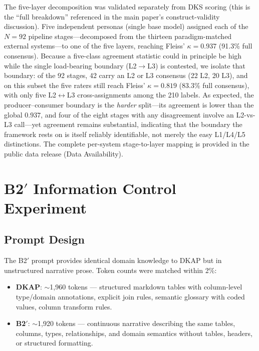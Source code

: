 \documentclass[10pt,a4paper]{article}
\begin{document}
The five-layer decomposition was validated separately from DKS scoring (this is the ``full breakdown'' referenced in the main paper's construct-validity discussion). Five independent personas (single base model) assigned each of the $N=92$ pipeline stages---decomposed from the thirteen paradigm-matched external systems---to one of the five layers, reaching Fleiss' $\kappa = 0.937$ (91.3\% full consensus). Because a five-class agreement statistic could in principle be high while the single load-bearing boundary (L2$\to$L3) is contested, we isolate that boundary: of the 92 stages, 42 carry an L2 or L3 consensus (22 L2, 20 L3), and on this subset the five raters still reach Fleiss' $\kappa = 0.819$ (83.3\% full consensus), with only five L2$\leftrightarrow$L3 cross-assignments among the 210 labels. As expected, the producer--consumer boundary is the \textit{harder} split---its agreement is lower than the global $0.937$, and four of the eight stages with any disagreement involve an L2-vs-L3 call---yet agreement remains substantial, indicating that the boundary the framework rests on is itself reliably identifiable, not merely the easy L1/L4/L5 distinctions. The complete per-system stage-to-layer mapping is provided in the public data release (Data Availability).


\section{\texorpdfstring{B2$'$}{B2'} Information Control Experiment}
\label{sec:b2prime_detail}

\subsection{Prompt Design}

The B2$'$ prompt provides identical domain knowledge to DKAP but in unstructured narrative prose. Token counts were matched within 2\%:

\begin{itemize}
\item \textbf{DKAP}: ${\sim}$1,960 tokens --- structured markdown tables with column-level type/domain annotations, explicit join rules, semantic glossary with coded values, column transform rules.
\item \textbf{B2$'$}: ${\sim}$1,920 tokens --- continuous narrative describing the same tables, columns, types, relationships, and domain semantics without tables, headers, or structured formatting.
\end{itemize}
\end{document}
